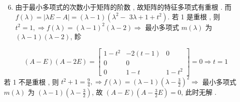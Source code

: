 \documentclass[10pt]{article}
\begin{document}
\begin{enumerate}
  \setcounter{enumi}{5}
  \item  由于最小多项式的次数小于矩阵的阶数 ,  故矩阵的特征多项式有重根 .  而  $f(\lambda)=|\lambda E-A|=(\lambda-1)\left(\lambda^{2}-\right.$ $\left.3 \lambda+1+t^{2}\right)$.  若  1  是重根 ,  则  $t^{2}=1, \Longrightarrow f(\lambda)=(\lambda-1)^{2}(\lambda-2) \Longrightarrow$  最小多项式  $m(\lambda)$  为  $(\lambda-1)(\lambda-2)$,  眕 
\end{enumerate}
$$
(A-E)(A-2 E)=\left[\begin{array}{ccc}
1-t^{2} & -2(t-1) & 0 \\
0 & 0 & \\
0 & 1-t & 1-t^{2}
\end{array}\right]=0 \Rightarrow t=1
$$
 若  1  不是重根 ,  则  $t^{2}+1=\frac{9}{4}, \Longrightarrow f(\lambda)=(\lambda-1)\left(\lambda-\frac{3}{2}\right)^{2} \Longrightarrow$  最小多项式  $m(\lambda)$  为  $(\lambda-1)\left(\lambda-\frac{3}{2}\right)$,  故  $(A-E)\left(A-\frac{3}{2} E\right)=0$,  此时无解 .
\end{document}

